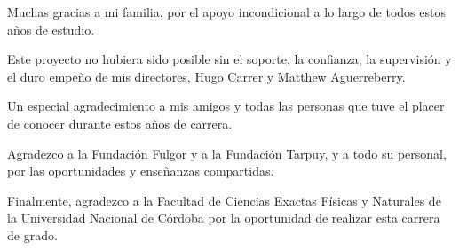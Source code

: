 \documentclass[
11pt, %
spanish, %
singlespacing, %
headsepline, %
]{MastersDoctoralThesis} %
\begin{document}

 
\begin{acknowledgements}
	
	\addchaptertocentry{\acknowledgementname} %

	Muchas gracias a mi familia, por el apoyo incondicional a lo largo de todos estos años de estudio.  
	\bigskip
			
	Este proyecto no hubiera sido posible sin el soporte, la confianza, la supervisión y el duro empeño de mis directores, Hugo Carrer y Matthew Aguerreberry.
	\bigskip
			
	Un especial agradecimiento a mis amigos y todas las personas que tuve el placer de conocer durante estos años de carrera.
	\bigskip
		
	Agradezco a la Fundación Fulgor y a la Fundación Tarpuy, y a todo su personal, por las oportunidades y enseñanzas compartidas.
	\bigskip
			
	Finalmente, agradezco a la Facultad de Ciencias Exactas Físicas y Naturales de la Universidad Nacional de Córdoba por la oportunidad de realizar esta carrera de grado.

	\vspace*{\fill}
		
\end{acknowledgements}


\hypersetup{
	linkcolor=black,
	citecolor=black,
	urlcolor=black
	}

\tableofcontents %
\end{document}
